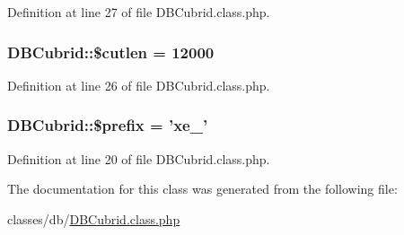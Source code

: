 Definition at line 27 of file D\+B\+Cubrid.\+class.\+php.

\hypertarget{classDBCubrid_a0f61a81aecf7cd9829d0fc390b2895a5}{
\subsubsection[{\$cutlen}]{\setlength{\rightskip}{0pt plus 5cm}D\+B\+Cubrid\+::\$cutlen = 12000}}\label{classDBCubrid_a0f61a81aecf7cd9829d0fc390b2895a5}


Definition at line 26 of file D\+B\+Cubrid.\+class.\+php.

\hypertarget{classDBCubrid_a78aa323ac3bf494cbc63d3a2ae05a6f5}{
\subsubsection[{\$prefix}]{\setlength{\rightskip}{0pt plus 5cm}D\+B\+Cubrid\+::\$prefix = 'xe\+\_\+'}}\label{classDBCubrid_a78aa323ac3bf494cbc63d3a2ae05a6f5}


Definition at line 20 of file D\+B\+Cubrid.\+class.\+php.



The documentation for this class was generated from the following file\+:\begin{DoxyCompactItemize}
\item 
classes/db/\hyperlink{DBCubrid_8class_8php}{D\+B\+Cubrid.\+class.\+php}\end{DoxyCompactItemize}
